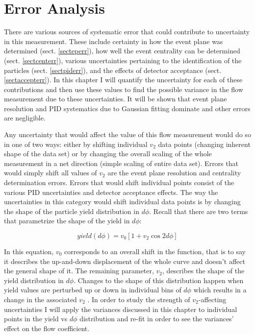 
\chapter{Error Analysis} %
There are various sources of systematic error that could contribute to uncertainty in this measurement. These include certainty in how the event plane was determined (sect. \ref{secteperr}), how well the event centrality can be determined (sect. \ref{sectcenterr}), various uncertainties pertaining to the identification of the particles (sect. \ref{sectpiderr}), and the effects of detector acceptance (sect. \ref{sectaccepterr}). In this chapter I will quantify the uncertainty for each of these contributions and then use these values to find the possible variance in the flow measurement due to these uncertainties. It will be shown that event plane resolution and PID systematics due to Gaussian fitting dominate and other errors are negligible.

Any uncertainty that would affect the value of this flow measurement would do so in one of two ways: either by shifting individual $v_2$ data points (changing inherent shape of the data set) or by changing the overall scaling of the whole measurement in a net direction (simple scaling of entire data set). Errors that would simply shift all values of $v_2$ are the event plane resolution and centrality determination errors. Errors that would shift individual points consist of the various PID uncertainties and detector acceptance effects. The way the uncertainties in this category would shift individual data points is by changing the shape of the particle yield distribution in $d\phi$. Recall that there are two terms that parametrize the shape of the yield in $d\phi$:

\begin{equation}
yield(d\phi) = v_0 [1 + v_2 \cos 2d\phi]
\end{equation}

In this equation, $v_0$ corresponds to an overall shift in the function, that is to say it describes the up-and-down displacement of the whole curve and doesn't affect the general shape of it. The remaining parameter, $v_2$, describes the shape of the yield distribution in $d\phi$. Changes to the shape of this distribution happen when yield values are perturbed up or down in individual bins of $d\phi$ which results in a change in the associated $v_2$ . In order to study the strength of $v_2$-affecting uncertainties I will apply the variances discussed in this chapter to individual points in the yield vs $d\phi$ distribution and re-fit in order to see the variances' effect on the flow coefficient. 

